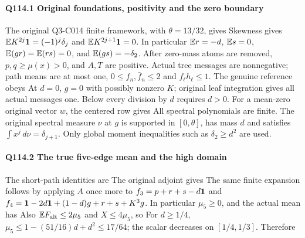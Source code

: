 \paragraph{Q114.1 Original foundations, positivity and the zero boundary}\label{part:Q114.1}
The original Q3-C014 finite framework, with $\theta=\allowbreak 13/32$, gives
Skewness gives $\mathbb E K^{2j}\mathbf1=\allowbreak (-1)^j\delta_j$ and
$\mathbb E K^{2j+1}\mathbf1=\allowbreak 0$.
In particular $\mathbb E r=\allowbreak -d$, $\mathbb E s=\allowbreak 0$,
$\mathbb E(gr)=\allowbreak \mathbb E(rs)=\allowbreak 0$, and $\mathbb E(gs)=\allowbreak -\delta_2$.
After zero-mass atoms are removed, $p,\allowbreak q\ge\allowbreak \mu(x)>\allowbreak 0$, and $A,\allowbreak T$ are
positive. Actual tree messages are nonnegative; path means are at most
one, $0\le\allowbreak  f_n,\allowbreak \bar f_n\le\allowbreak 2$ and $f_\ell h_\ell\le\allowbreak 1$.
The genuine reference obeys
At $d=\allowbreak 0$, $g=\allowbreak 0$ with possibly nonzero $K$; original leaf integration
gives all actual messages one. Below every division by $d$ requires $d>\allowbreak 0$.
For a mean-zero original vector $w$, the centered row gives
All spectral polynomials are finite.
The original spectral measure $\nu$ at $g$ is supported in $[0,\allowbreak \theta]$,
has mass $d$ and satisfies $\int x^j\,\allowbreak d\nu=\allowbreak \delta_{j+1}$.
Only global moment inequalities such as $\delta_2\ge\allowbreak  d^2$ are used.

\paragraph{Q114.2 The true five-edge mean and the high domain}\label{part:Q114.2}
The short-path identities are
The original adjoint gives
The same finite expansion follows by applying $A$ once more to
$f_3=\allowbreak p+r+s-d\mathbf1$ and
$f_4=\allowbreak \mathbf1-2d\mathbf1+(1-d)g+r+s+K^3g$.
In particular $\mu_5\ge\allowbreak 0$, and the actual mean has
Also $\mathbb E F_{\rm alt}\le\allowbreak 2\mu_5$ and $X\le\allowbreak 4\mu_5$, so
For $d\ge\allowbreak 1/4$, $\mu_5\le\allowbreak 1-(51/16)d+d^2\le\allowbreak 17/64$;
the scalar decreases on $[1/4,\allowbreak 1/3]$.
Therefore

